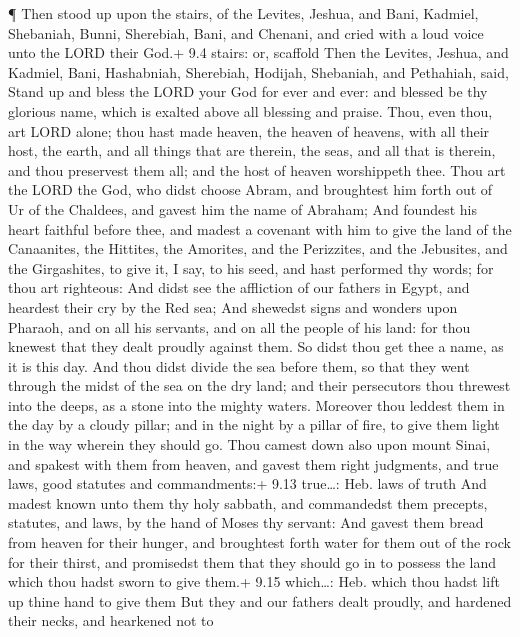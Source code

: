  ¶ Then stood up upon the stairs, of the Levites, Jeshua,
and Bani, Kadmiel, Shebaniah, Bunni, Sherebiah, Bani, and Chenani, and
cried with a loud voice unto the LORD their God.+ 9.4 stairs: or,
scaffold  Then the Levites, Jeshua, and Kadmiel, Bani,
Hashabniah, Sherebiah, Hodijah, Shebaniah, and Pethahiah, said, Stand up
and bless the LORD your God for ever and ever: and blessed be thy
glorious name, which is exalted above all blessing and praise.
 Thou, even thou, art LORD alone; thou hast made heaven, the
heaven of heavens, with all their host, the earth, and all things that
are therein, the seas, and all that is therein, and thou preservest them
all; and the host of heaven worshippeth thee.  Thou art the
LORD the God, who didst choose Abram, and broughtest him forth out of Ur
of the Chaldees, and gavest him the name of Abraham;  And
foundest his heart faithful before thee, and madest a covenant with him
to give the land of the Canaanites, the Hittites, the Amorites, and the
Perizzites, and the Jebusites, and the Girgashites, to give it, I say,
to his seed, and hast performed thy words; for thou art righteous:
 And didst see the affliction of our fathers in Egypt, and
heardest their cry by the Red sea;  And shewedst signs and
wonders upon Pharaoh, and on all his servants, and on all the people of
his land: for thou knewest that they dealt proudly against them. So
didst thou get thee a name, as it is this day.  And thou
didst divide the sea before them, so that they went through the midst of
the sea on the dry land; and their persecutors thou threwest into the
deeps, as a stone into the mighty waters.  Moreover thou
leddest them in the day by a cloudy pillar; and in the night by a pillar
of fire, to give them light in the way wherein they should go.
 Thou camest down also upon mount Sinai, and spakest with
them from heaven, and gavest them right judgments, and true laws, good
statutes and commandments:+ 9.13 true\ldots: Heb. laws of truth
 And madest known unto them thy holy sabbath, and
commandedst them precepts, statutes, and laws, by the hand of Moses thy
servant:  And gavest them bread from heaven for their
hunger, and broughtest forth water for them out of the rock for their
thirst, and promisedst them that they should go in to possess the land
which thou hadst sworn to give them.+ 9.15 which\ldots: Heb. which thou
hadst lift up thine hand to give them  But they and our
fathers dealt proudly, and hardened their necks, and hearkened not to
